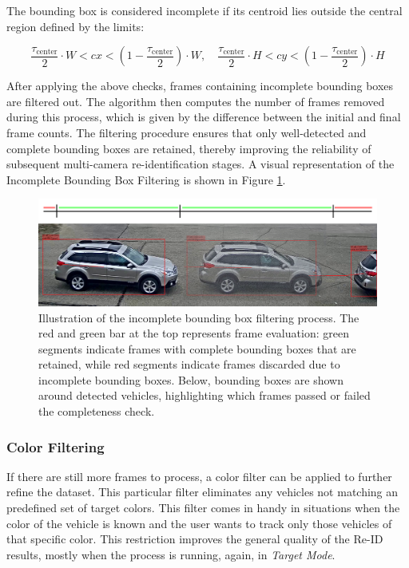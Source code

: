 The bounding box is considered incomplete if its centroid lies outside the central region defined by the limits:

\[
\frac{\tau_{\text{center}}}{2} \cdot W < cx < \left(1 - \frac{\tau_{\text{center}}}{2}\right) \cdot W, \quad \frac{\tau_{\text{center}}}{2} \cdot H < cy < \left(1 - \frac{\tau_{\text{center}}}{2}\right) \cdot H
\]

After applying the above checks, frames containing incomplete bounding boxes are filtered out. The algorithm then computes the number of frames removed during this process, which is given by the difference between the initial and final frame counts. The filtering procedure ensures that only well-detected and complete bounding boxes are retained, thereby improving the reliability of subsequent multi-camera re-identification stages. A visual representation of the Incomplete Bounding Box Filtering is shown in Figure \ref{fig:IncompleteBBFiltering}.

\begin{figure}[H]
    \centering
    \includegraphics[width=1.0\textwidth]{images/IncompleteFiltering.png}
    \caption[Incomplete Bounding Box Filtering]{Illustration of the incomplete bounding box filtering process. The red and green bar at the top represents frame evaluation: green segments indicate frames with complete bounding boxes that are retained, while red segments indicate frames discarded due to incomplete bounding boxes. Below, bounding boxes are shown around detected vehicles, highlighting which frames passed or failed the completeness check.}
    \label{fig:IncompleteBBFiltering}
\end{figure}

\subsubsection{Color Filtering}
\label{subsubsec:ColorFiltering}
If there are still more frames to process, a color filter can be applied to further refine the dataset. This particular filter eliminates any vehicles not matching an predefined set of target colors. This filter comes in handy in situations when the color of the vehicle is known and the user wants to track only those vehicles of that specific color. This restriction improves the general quality of the Re-ID results, mostly when the process is running, again, in \textit{Target Mode}.

